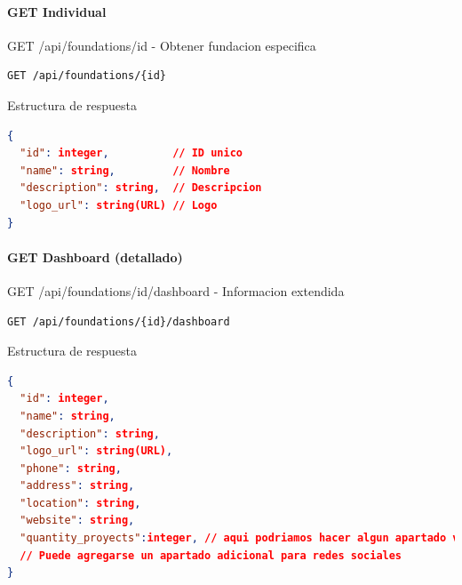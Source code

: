\documentclass[11pt,a4paper]{article}
\begin{document}
\paragraph{GET Individual}

\begin{center}
	\begin{minipage}{\textwidth}
		\begin{codebox}{GET /api/foundations/{id} - Obtener fundacion especifica}
			\begin{lstlisting}[language=HTTP]
GET /api/foundations/{id}
\end{lstlisting}
		\end{codebox}
	\end{minipage}
\end{center}

\begin{center}
	\begin{minipage}{\textwidth}
		\begin{codebox}{Estructura de respuesta}
			\begin{lstlisting}[language=json]
{
  "id": integer,          // ID unico
  "name": string,         // Nombre
  "description": string,  // Descripcion
  "logo_url": string(URL) // Logo
}
\end{lstlisting}
		\end{codebox}
	\end{minipage}
\end{center}

\paragraph{GET Dashboard (detallado)}

\begin{center}
	\begin{minipage}{\textwidth}
		\begin{codebox}{GET /api/foundations/{id}/dashboard - Informacion extendida}
			\begin{lstlisting}[language=HTTP]
GET /api/foundations/{id}/dashboard
\end{lstlisting}
		\end{codebox}
	\end{minipage}
\end{center}

\begin{center}
	\begin{minipage}{\textwidth}
		\begin{codebox}{Estructura de respuesta}
			\begin{lstlisting}[language=json]
{
  "id": integer,
  "name": string,
  "description": string,
  "logo_url": string(URL),
  "phone": string,
  "address": string,
  "location": string,
  "website": string,
  "quantity_proyects":integer, // aqui podriamos hacer algun apartado visual bonito
  // Puede agregarse un apartado adicional para redes sociales
}
\end{lstlisting}
		\end{codebox}
	\end{minipage}
\end{center}
\end{document}
